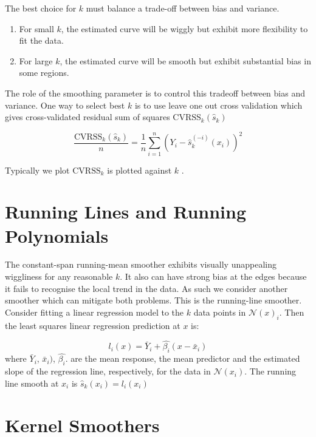 \documentclass[twoside]{article}
\theoremstyle{definition}
\theoremstyle{definition}
\begin{document}
The best choice for $k$ must balance a trade-off between bias and variance. 


\begin{enumerate}
	\item For small $k$, the estimated curve will be wiggly but exhibit more flexibility  to fit the data. 
	\item For large $k$, the estimated curve will be smooth but exhibit substantial bias in some regions. 
\end{enumerate}

The role of the smoothing parameter is to control this tradeoff between bias and variance. One way to select best $k$ is to use leave one out cross validation which gives cross-validated residual sum of squares $\text{CVRSS}_k(\hat{s}_k)$

\begin{equation}
	\frac{\text{CVRSS}_k(\hat{s}_k)}{n} = \frac{1}{n} \sum^n_{i=1} \left( Y_i - \hat{s}_k^{(-i)} (x_i) \right)^2
\end{equation} 

Typically we plot $\text{CVRSS}_k$ is plotted against $k$ .

\section{Running Lines and Running Polynomials} 

The constant-span running-mean smoother exhibits visually unappealing wiggliness for any reasonable $k$. It also can have strong bias at the edges because it fails to recognise the local trend in the data. As such we consider another smoother which can mitigate both problems. This is the running-line smoother. Consider fitting a linear regression model to the $k$ data points in $\mathcal{N}(x)_i$. Then the least squares linear regression prediction at $x$ is:

\begin{equation}
	l_i(x) = \bar{Y}_i + \hat{\beta_i} (x - \bar{x}_i)
\end{equation}
where $\bar{Y}_i$, $\bar{x}_i)$, $\hat{\beta_i}$. are the mean response, the mean predictor and the estimated slope of the regression line, respectively, for the data in $\mathcal{N}(x_i)$. The running line smooth at $x_i$ is $\hat{s}_k(x_i) = l_i(x_i)$


\section{Kernel Smoothers}
\end{document}
